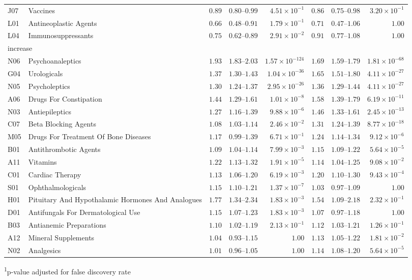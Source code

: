\begin{longtable}{llrrrrrr}
J07 & Vaccines & $0.89$ & $0.80$–$0.99$ & $4.51 \times 10^{-1}$ & $0.86$ & $0.75$–$0.98$ & $3.20 \times 10^{-1}$ \\ 
L01 & Antineoplastic Agents & $0.66$ & $0.48$–$0.91$ & $1.79 \times 10^{-1}$ & $0.71$ & $0.47$–$1.06$ & $1.00$ \\ 
L04 & Immunosuppressants & $0.75$ & $0.62$–$0.89$ & $2.91 \times 10^{-2}$ & $0.91$ & $0.77$–$1.08$ & $1.00$ \\ 
\midrule
\multicolumn{8}{l}{increase} \\ 
\midrule
N06 & Psychoanaleptics & $1.93$ & $1.83$–$2.03$ & $1.57 \times 10^{-124}$ & $1.69$ & $1.59$–$1.79$ & $1.81 \times 10^{-68}$ \\ 
G04 & Urologicals & $1.37$ & $1.30$–$1.43$ & $1.04 \times 10^{-36}$ & $1.65$ & $1.51$–$1.80$ & $4.11 \times 10^{-27}$ \\ 
N05 & Psycholeptics & $1.30$ & $1.24$–$1.37$ & $2.95 \times 10^{-26}$ & $1.36$ & $1.29$–$1.44$ & $4.11 \times 10^{-27}$ \\ 
A06 & Drugs For Constipation & $1.44$ & $1.29$–$1.61$ & $1.01 \times 10^{-8}$ & $1.58$ & $1.39$–$1.79$ & $6.19 \times 10^{-11}$ \\ 
N03 & Antiepileptics & $1.27$ & $1.16$–$1.39$ & $9.88 \times 10^{-6}$ & $1.46$ & $1.33$–$1.61$ & $2.45 \times 10^{-13}$ \\ 
C07 & Beta Blocking Agents & $1.08$ & $1.03$–$1.14$ & $2.46 \times 10^{-2}$ & $1.31$ & $1.24$–$1.39$ & $8.77 \times 10^{-18}$ \\ 
M05 & Drugs For Treatment Of Bone Diseases & $1.17$ & $0.99$–$1.39$ & $6.71 \times 10^{-1}$ & $1.24$ & $1.14$–$1.34$ & $9.12 \times 10^{-6}$ \\ 
B01 & Antithrombotic Agents & $1.09$ & $1.04$–$1.14$ & $7.99 \times 10^{-3}$ & $1.15$ & $1.09$–$1.22$ & $5.64 \times 10^{-5}$ \\ 
A11 & Vitamins & $1.22$ & $1.13$–$1.32$ & $1.91 \times 10^{-5}$ & $1.14$ & $1.04$–$1.25$ & $9.08 \times 10^{-2}$ \\ 
C01 & Cardiac Therapy & $1.13$ & $1.06$–$1.20$ & $6.19 \times 10^{-3}$ & $1.20$ & $1.10$–$1.30$ & $9.43 \times 10^{-4}$ \\ 
S01 & Ophthalmologicals & $1.15$ & $1.10$–$1.21$ & $1.37 \times 10^{-7}$ & $1.03$ & $0.97$–$1.09$ & $1.00$ \\ 
H01 & Pituitary And Hypothalamic Hormones And Analogues & $1.77$ & $1.34$–$2.34$ & $1.83 \times 10^{-3}$ & $1.54$ & $1.09$–$2.18$ & $2.32 \times 10^{-1}$ \\ 
D01 & Antifungals For Dermatological Use & $1.15$ & $1.07$–$1.23$ & $1.83 \times 10^{-3}$ & $1.07$ & $0.97$–$1.18$ & $1.00$ \\ 
B03 & Antianemic Preparations & $1.10$ & $1.02$–$1.19$ & $2.13 \times 10^{-1}$ & $1.12$ & $1.03$–$1.21$ & $1.26 \times 10^{-1}$ \\ 
A12 & Mineral Supplements & $1.04$ & $0.93$–$1.15$ & $1.00$ & $1.13$ & $1.05$–$1.22$ & $1.81 \times 10^{-2}$ \\ 
N02 & Analgesics & $1.01$ & $0.96$–$1.05$ & $1.00$ & $1.14$ & $1.08$–$1.20$ & $5.64 \times 10^{-5}$ \\ 
\bottomrule
\end{longtable}
\begin{minipage}{\linewidth}
\textsuperscript{1}p-value adjusted for false discovery rate\\
\end{minipage}

